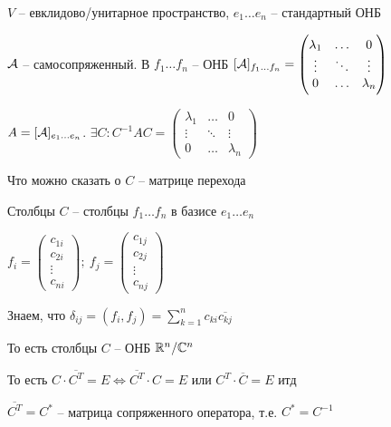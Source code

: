 \documentclass[12pt]{article}
\begin{document}
\begin{nota}{}
    $V$ -- евклидово/унитарное пространство, $e_1 \ldots e_n$ -- стандартный ОНБ 

    $\mathcal{A}$ -- самосопряженный. В $f_1 \ldots f_n$ -- ОНБ $[\mathcal{A}]_{f_1 \ldots f_n} = \begin{pmatrix}
        \lambda_1 & \ldots & 0 \\
        \vdots & \ddots & \vdots \\
        0 & \ldots & \lambda_n
    \end{pmatrix}$

    $A = [\mathcal{A}]_{e_1 \ldots e_n}$. $\exists C : C^{-1}AC = \begin{pmatrix}
        \lambda_1 & \ldots & 0 \\
        \vdots & \ddots & \vdots \\
        0 & \ldots & \lambda_n
    \end{pmatrix}$

    Что можно сказать о $C$ -- матрице перехода

    Столбцы $C$ -- столбцы $f_1 \ldots f_n$ в базисе $e_1 \ldots e_n$

    $f_{i} = \begin{pmatrix}
        c_{1i} \\
        c_{2i} \\
        \vdots \\
        c_{ni}
    \end{pmatrix};\ f_{j} = \begin{pmatrix}
        c_{1j} \\
        c_{2j} \\
        \vdots \\
        c_{nj}
    \end{pmatrix}$

    Знаем, что $\delta_{ij} = (f_i, f_j) = \sum\limits_{k = 1}^n c_{ki}\overline{c_{kj}}$

    То есть столбцы $C$ -- ОНБ $\mathbb R^n/\mathbb C^n$ 

    То есть $C \cdot \overline{C^T} = E \Leftrightarrow \overline{C^T} \cdot C = E$ или $C^T \cdot \overline{C} = E$ итд 
\end{nota}

\begin{Reminder}{}
    $\overline{C^T} = C^*$ -- матрица сопряженного оператора, т.е. $C^* = C^{-1}$
\end{Reminder}
\end{document}
